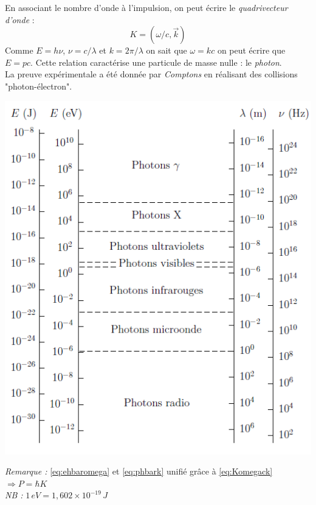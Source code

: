 \documentclass	[11pt, a4paper, openany]{book}
\begin{document}
En associant le nombre d'onde à l'impulsion, on peut écrire le \textit{quadrivecteur d'onde} :
\begin{equation}\label{eq:Komegack}
K = (\omega / c, \vec{k})
\end{equation}
Comme $E = h\nu$, $\nu = c/\lambda$ et $k = 2\pi/\lambda$ on sait que $\omega = kc$ on peut écrire que $E = pc$. Cette relation caractérise une particule de masse nulle : le \textit{photon}.\ \\
La preuve expérimentale a été donnée par \textit{Comptons} en réalisant des collisions "photon-électron".\\

\begin{center}
\includegraphics[scale = 0.5]{img/tableaucoeur}
\end{center}
\textit{Remarque :} \eqref{eq:ehbaromega} et \eqref{eq:phbark} unifié grâce à \eqref{eq:Komegack}$\Rightarrow P=\hbar K$\\
\textit{NB :} $1\,eV=1,602\times 10^{-19}\,J$
\end{document}
